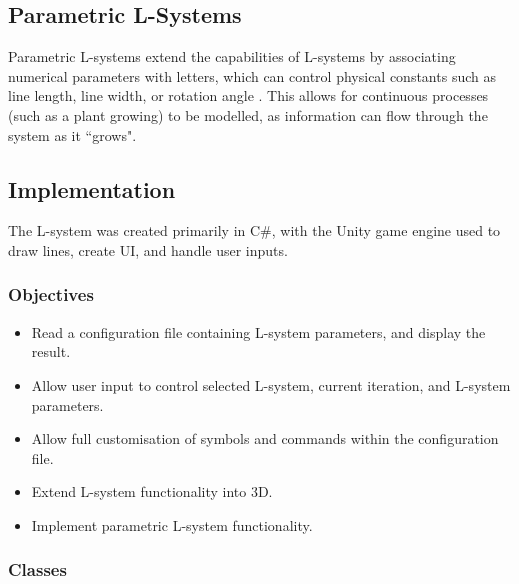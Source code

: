 \documentclass[12pt]{article}
\begin{document}
\subsection{Parametric L-Systems}
Parametric L-systems extend the capabilities of L-systems by associating numerical parameters with letters, which can control physical constants such as line length, line width, or rotation angle \cite{Hanan}. This allows for continuous processes (such as a plant growing) to be modelled, as information can flow through the system as it ``grows". 
\subsection{Implementation}
The L-system was created primarily in C\#, with the Unity game engine used to draw lines, create UI, and handle user inputs.
\subsubsection{Objectives}
\begin{itemize}
\item Read a configuration file containing L-system parameters, and display the result.
\item Allow user input to control selected L-system, current iteration, and L-system parameters.
\item Allow full customisation of symbols and commands within the configuration file.
\item Extend L-system functionality into 3D.
\item Implement parametric L-system functionality.
\end{itemize}
\subsubsection{Classes}
\end{document}
